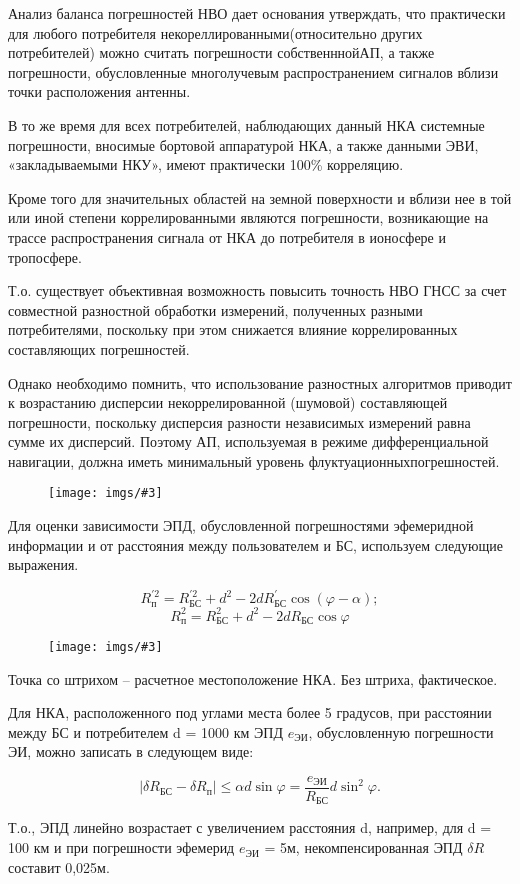 \documentclass[14pt,a4paper,oneside]{extarticle}
\newcommand{\pic}[3]{
	\begin{figure}[#1]
		\begin{center}
			\texttt{[image: imgs/\#3]}
		\end{center}
	\end{figure}
}
\begin{document}
Анализ баланса погрешностей НВО дает основания утверждать, что практически для любого потребителя некореллированными(относительно других потребителей) можно считать погрешности собственннойАП, а также погрешности, обусловленные многолучевым распространением сигналов вблизи точки расположения антенны.

В то же время для всех потребителей, наблюдающих данный НКА системные погрешности, вносимые бортовой аппаратурой НКА, а также данными ЭВИ, «закладываемыми НКУ», имеют практически 100\% корреляцию.

Кроме того для значительных областей на земной поверхности и вблизи нее в той или иной степени коррелированными являются погрешности, возникающие на трассе распространения сигнала от НКА до потребителя в ионосфере и тропосфере.

Т.о. существует объективная возможность повысить точность НВО ГНСС за счет совместной разностной обработки измерений, полученных разными потребителями, поскольку при этом снижается влияние коррелированных составляющих погрешностей.

Однако необходимо помнить, что использование разностных алгоритмов приводит к возрастанию дисперсии некоррелированной (шумовой) составляющей погрешности, поскольку дисперсия разности независимых измерений равна сумме их дисперсий. Поэтому АП, используемая в режиме дифференциальной навигации, должна иметь минимальный уровень флуктуационныхпогрешностей.

\pic{H}{\textwidth}{7}

Для оценки зависимости ЭПД, обусловленной погрешностями эфемеридной информации и от расстояния между пользователем и БС, используем следующие выражения.

\[R_{\text{п}}^{\prime2}=R_{\text{БС}}^{\prime2}+d^2-2dR_{\text{БС}}^{\prime}\cos(\varphi-\alpha);\]
\[R_{\text{п}} ^ 2 = R_{\text{БС}} ^ 2 + d ^ 2 - 2 d R_{\text{БС}} \cos \varphi\]

\pic{H}{\textwidth/2}{2}

Точка со штрихом – расчетное местоположение НКА. Без штриха, фактическое.

Для НКА, расположенного под углами места более 5 градусов, при расстоянии между БС и потребителем d = 1000 км ЭПД $e_\text{ЭИ}$, обусловленную погрешности ЭИ, можно записать в следующем виде:

\[|\delta R_\text{БС}-\delta R_\text{{п}}|\leqslant\alpha d\sin\varphi=\frac{e_\text{ЭИ}}{R_\text{БС}}d\sin^2\varphi.\]

Т.о., ЭПД линейно возрастает с увеличением расстояния d, например, для d = 100 км и при погрешности эфемерид $e_\text{ЭИ}$ = 5м, некомпенсированная ЭПД $\delta R$ составит 0,025м.
\end{document}
